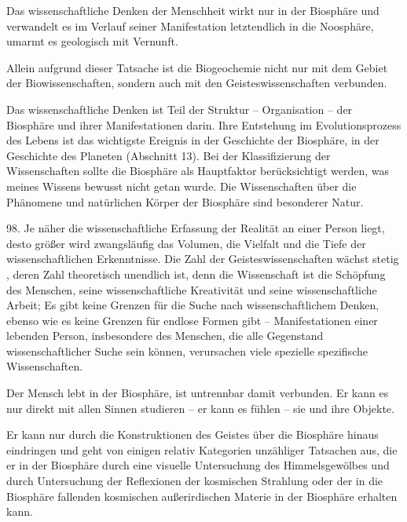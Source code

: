 \documentclass[11pt,a4paper]{book}
\begin{document}
Das wissenschaftliche Denken der Menschheit wirkt nur in der Biosphäre und verwandelt es im Verlauf seiner Manifestation letztendlich in die Noosphäre, umarmt es geologisch mit Vernunft.



Allein aufgrund dieser Tatsache ist die Biogeochemie nicht nur mit dem Gebiet der Biowissenschaften, sondern auch mit den Geisteswissenschaften verbunden.



Das wissenschaftliche Denken ist Teil der Struktur -- Organisation -- der Biosphäre und ihrer Manifestationen darin. Ihre Entstehung im Evolutionsprozess des Lebens ist das wichtigste Ereignis in der Geschichte der Biosphäre, in der Geschichte des Planeten (Abschnitt 13). Bei der Klassifizierung der Wissenschaften sollte die Biosphäre als Hauptfaktor berücksichtigt werden, was meines Wissens bewusst nicht getan wurde. Die Wissenschaften über die Phänomene und natürlichen Körper der Biosphäre sind besonderer Natur.



98. Je näher die wissenschaftliche Erfassung der Realität an einer Person liegt, desto größer wird zwangsläufig das Volumen, die Vielfalt und die Tiefe der wissenschaftlichen Erkenntnisse. Die Zahl der Geisteswissenschaften wächst stetig , deren Zahl theoretisch unendlich ist, denn die Wissenschaft ist die Schöpfung des Menschen, seine wissenschaftliche Kreativität und seine wissenschaftliche Arbeit; Es gibt keine Grenzen für die Suche nach wissenschaftlichem Denken, ebenso wie es keine Grenzen für endlose Formen gibt -- Manifestationen einer lebenden Person, insbesondere des Menschen, die alle Gegenstand wissenschaftlicher Suche sein können, verursachen viele spezielle spezifische Wissenschaften.



Der Mensch lebt in der Biosphäre, ist untrennbar damit verbunden. Er kann es nur direkt mit allen Sinnen studieren -- er kann es fühlen -- sie und ihre Objekte.



Er kann nur durch die Konstruktionen des Geistes über die Biosphäre hinaus eindringen und geht von einigen relativ Kategorien unzähliger Tatsachen aus, die er in der Biosphäre durch eine visuelle Untersuchung des Himmelsgewölbes und durch Untersuchung der Reflexionen der kosmischen Strahlung oder der in die Biosphäre fallenden kosmischen außerirdischen Materie in der Biosphäre erhalten kann.
\end{document}

